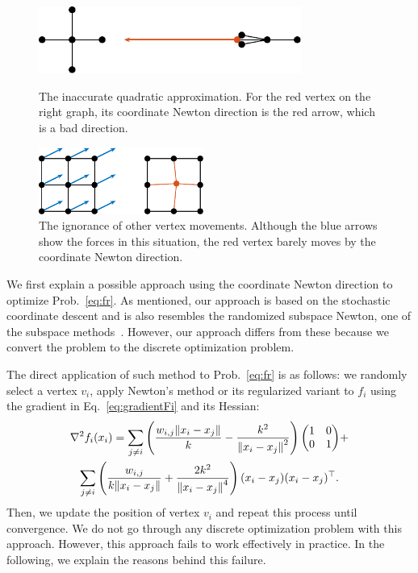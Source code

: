 \documentclass[dvipdfmx,10pt,journal,compsoc]{IEEEtran}
\begin{document}
\begin{figure}[t]
  \centering
  \begin{minipage}{\columnwidth}
    \centering
    \includegraphics[height=2.2cm]{whyRSNfail/whyRSNfail.pdf}
    \caption{
      The inaccurate quadratic approximation.
      For the red vertex on the right graph, its coordinate Newton direction is the red arrow, which is a bad direction.
    }
    \label{fig:whyRSNfail}
  \end{minipage}
  \begin{minipage}{\columnwidth}
    \centering
    \includegraphics[height=2.2cm]{whyRSNfail2/whyRSNfail2.pdf}
    \caption{
      The ignorance of other vertex movements.
      Although the blue arrows show the forces in this situation, the red vertex barely moves by the coordinate Newton direction.
    }
    \label{fig:whyRSNfail2}
  \end{minipage}
\end{figure}

We first explain a possible approach using the coordinate Newton direction to optimize Prob.~\eqref{eq:fr}.
As mentioned, our approach is based on the stochastic coordinate descent and is also resembles the randomized subspace Newton, one of the subspace methods~\cite{NEURIPS2019_bc6dc48b,
  fujiRandomizedSubspaceRegularized2022,
  cartisRandomisedSubspaceMethods2022,
  nozawaRandomizedSubspaceGradient2023,
  higuchiFastConvergenceSecondOrder2024}.
However, our approach differs from these because we convert the problem to the discrete optimization problem.

The direct application of such method to Prob.~\eqref{eq:fr} is as follows: we randomly select a vertex $v_i$, apply Newton's method or its regularized variant to $f_i$ using the gradient in Eq.~\eqref{eq:gradientFi} and its Hessian:
\begin{gather*}
  \nabla^2 f_i(x_i) = \sum_{j \neq i} \left(\frac{w_{i,j}\norm{x_i - x_j}}{k} - \frac{k^2}{\norm{x_i - x_j}^2}\right) \mqty(1&0\\0&1)+ \\
  \sum_{j \neq i} \left(\frac{w_{i,j}}{k \norm{x_i - x_j}} + \frac{2k^2}{\norm{x_i - x_j}^4}\right) (x_i - x_j)(x_i - x_j)^\top.
\end{gather*}
Then, we update the position of vertex $v_i$ and repeat this process until convergence. We do not go through any discrete optimization problem with this approach.
However, this approach fails to work effectively in practice.
In the following, we explain the reasons behind this failure.
\end{document}
